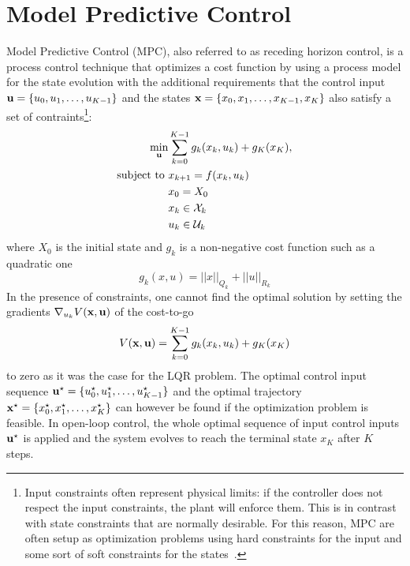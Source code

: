 \chapter{Model Predictive Control}
\label{sec:MPC}

Model Predictive Control (MPC), also referred to as receding horizon control, is a process control technique that optimizes a cost function by using a process model for the state evolution with the additional requirements that the control input $\boldsymbol{\mathrm{u}} = \{u_0,u_1,\ldots,u_{K-1}\}$ and the states $\boldsymbol{\mathrm{x}} = \{x_0,x_1,\ldots,x_{K-1},x_K\}$ also satisfy a set of contraints\footnote{Input constraints often represent physical limits: if the controller does not respect the input constraints, the plant will enforce them. This is in contrast with state constraints that are normally desirable. For this reason, MPC are often setup as optimization problems using hard constraints for the input and some sort of soft constraints for the states~\cite{MPC-diehl}.}:
\begin{equation}
  \label{eq:MPC-general-formulation}
  \begin{aligned}
    \min_{\boldsymbol{\mathrm{u}}} &\sum_{k=0}^{K-1} g_k(x_k,u_k) + g_K(x_K),\\
    \text{subject to } & x_{k+1} = f(x_k,u_k) \\
                     & x_0 = X_0 \\
                     & x_k \in \mathcal{X}_k \\
                     & u_k \in \mathcal{U}_k
  \end{aligned}
\end{equation}
where $X_0$ is the initial state and $g_k$ is a non-negative cost function such as a quadratic one
\begin{equation}
  \label{eq:quadratic-stage-cost}
  g_k(x,u) = ||x||_{Q_k} + ||u||_{R_k} %
\end{equation}
In the presence of constraints, one cannot find the optimal solution by setting the gradients $\nabla_{u_k} V(\boldsymbol{\mathrm{x}},\boldsymbol{\mathrm{u}})$ of the cost-to-go
\begin{equation}
  \label{eq:cost-to-go}
  V(\boldsymbol{\mathrm{x}},\boldsymbol{\mathrm{u}}) = \sum_{k=0}^{K-1} g_k(x_k,u_k) + g_K(x_K)
\end{equation}
to zero as it was the case for the LQR problem. The optimal control input sequence $\boldsymbol{\mathrm{u}}^\star = \{u_0^\star,u_1^\star,\ldots,u_{K-1}^\star\}$ and the optimal trajectory $\boldsymbol{\mathrm{x}}^\star = \{x_0^\star,x_1^\star,\ldots,x_K^\star\}$ can however be found if the optimization problem is feasible. In open-loop control, the whole optimal sequence of input control inputs $\boldsymbol{\mathrm{u}}^\star$ is applied and the system evolves to reach the terminal state $x_K$ after $K$ steps.

